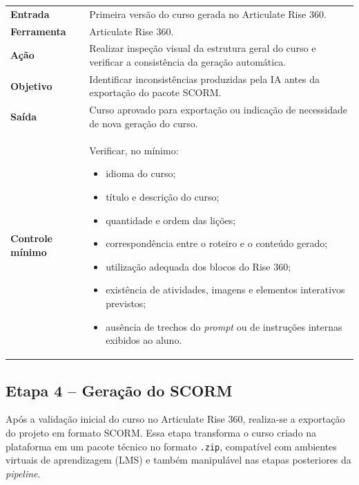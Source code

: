 \documentclass[12pt,a4paper]{article}
\newcommand{\campo}[1]{\textcolor{azulinst}{\textbf{#1}}}
\begin{document}
\begin{longtable}{p{}p{}}
\toprule

\campo{Entrada} &
Primeira versão do curso gerada no Articulate Rise 360. \\[0.5cm]

\campo{Ferramenta} &
Articulate Rise 360. \\[0.5cm]

\campo{Ação} &
Realizar inspeção visual da estrutura geral do curso e verificar a consistência da geração automática. \\[1cm]

\campo{Objetivo} &
Identificar inconsistências produzidas pela IA antes da exportação do pacote SCORM. \\[1cm]

\campo{Saída} &
Curso aprovado para exportação ou indicação de necessidade de nova geração do curso. \\[1cm]

\campo{Controle mínimo} &
Verificar, no mínimo:
\begin{itemize}[nosep,leftmargin=*]
    \item idioma do curso;
    \item título e descrição do curso;
    \item quantidade e ordem das lições;
    \item correspondência entre o roteiro e o conteúdo gerado;
    \item utilização adequada dos blocos do Rise 360;
    \item existência de atividades, imagens e elementos interativos previstos;
    \item ausência de trechos do \textit{prompt} ou de instruções internas exibidos ao aluno.
\end{itemize}
\\[1cm]

\bottomrule
\end{longtable}

\subsection{Etapa 4 -- Geração do SCORM}

Após a validação inicial do curso no Articulate Rise 360, realiza-se a exportação do projeto em formato SCORM. Essa etapa transforma o curso criado na plataforma em um pacote técnico no formato \texttt{.zip}, compatível com ambientes virtuais de aprendizagem (LMS) e também manipulável nas etapas posteriores da \textit{pipeline}.
\end{document}
